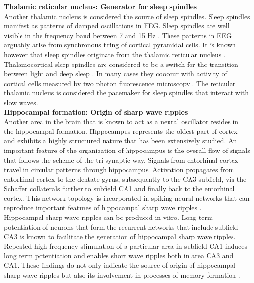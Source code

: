 \textbf{Thalamic reticular nucleus: Generator for sleep spindles}\\
Another thalamic nucleus is considered the source of sleep spindles. Sleep spindles manifest as patterns of damped oscillations in EEG. Sleep spindles are well visible in the frequency band between 7 and 15 Hz \parencite{niethard2018cortical}. These patterns in EEG arguably arise from synchronous firing of cortical pyramidal cells. It is known however that sleep spindles originate from the thalamic reticular nucleus \parencite{luthi2014sleep}. Thalamocortical sleep spindles are considered to be a switch for the transition between light and deep sleep \parencite{montagna2005fatal}. In many cases they cooccur with activity of cortical cells measured by two photon fluorescence microscopy \parencite{niethard2018cortical}. The reticular thalamic nucleus is considered the pacemaker for sleep spindles that interact with slow waves.\\

\textbf{Hippocampal formation: Origin of sharp wave ripples}\\
Another area in the brain that is known to act as a neural oscillator resides in the hippocampal formation. Hippocampus represents the oldest part of cortex and exhibits a highly structured nature that has been extensively studied. An important feature of the organization of hippocampus is the overall flow of signals that follows the scheme of the tri synaptic way. Signals from entorhinal cortex travel in circular patterns through hippocampus. Activation propagates from entorhinal cortex to the dentate gyrus, subsequently to the CA3 subfield, via the Schaffer collaterals further to subfield CA1 and finally back to the entorhinal cortex. This network topology is incorporated in spiking neural networks that can reproduce important features of hippocampal sharp wave ripples \parencite{aussel2018detailed}.\\
Hippocampal sharp wave ripples can be produced in vitro. Long term potentiation of neurons that form the recurrent networks that include subfield CA3 is known to facilitate the generation of hippocampal sharp wave ripples. Repeated high-frequency stimulation of a particular area in subfield CA1 induces long term potentiation and enables short wave ripples both in area CA3 and CA1. These findings do not only indicate the source of origin of hippocampal sharp wave ripples but also its involvement in processes of memory formation \parencite{behrens2005induction}.\\

